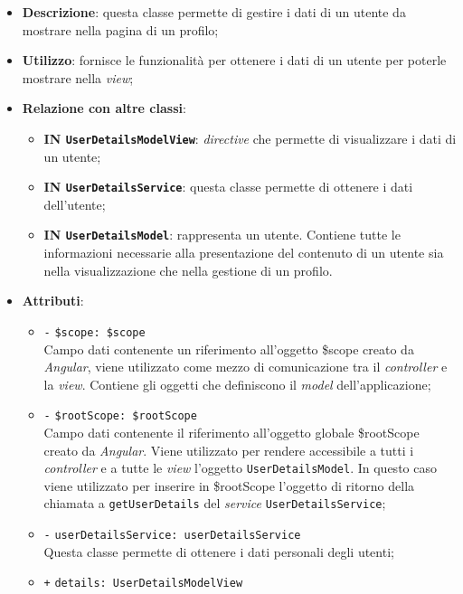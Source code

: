\begin{itemize}
	\item \textbf{Descrizione}: questa classe permette di gestire i dati di un utente da mostrare nella pagina di un profilo;
	\item \textbf{Utilizzo}: fornisce le funzionalità per ottenere i dati di un utente per poterle mostrare nella \textit{view};
	\item \textbf{Relazione con altre classi}:
	\begin{itemize}
		\item \textbf{IN \texttt{UserDetailsModelView}}: \textit{directive} che permette di visualizzare i dati di un utente; 
		\item \textbf{IN \texttt{UserDetailsService}}: questa classe permette di ottenere i dati dell'utente;
		\item \textbf{IN \texttt{UserDetailsModel}}: rappresenta un utente. Contiene tutte le informazioni necessarie alla presentazione del contenuto di un utente sia nella visualizzazione che nella gestione di un profilo.
	\end{itemize}
	\item \textbf{Attributi}:
	\begin{itemize}
		\item \texttt{-} \texttt{\$scope: \$scope} \\
		Campo dati contenente un riferimento all'oggetto \$scope creato da \textit{Angular}, viene utilizzato come mezzo di comunicazione tra il \textit{controller} e la \textit{view}. Contiene gli oggetti che definiscono il \textit{model} dell'applicazione;
		\item \texttt{-} \texttt{\$rootScope: \$rootScope} \\
		Campo dati contenente il riferimento all'oggetto globale \$rootScope creato da \textit{Angular}. Viene utilizzato per rendere accessibile a tutti i \textit{controller} e a tutte le \textit{view} l'oggetto \texttt{UserDetailsModel}. In questo caso viene utilizzato per inserire in \$rootScope l'oggetto di ritorno della chiamata a \texttt{getUserDetails} del \textit{service} \texttt{UserDetailsService};
		\item \texttt{-} \texttt{userDetailsService: userDetailsService} \\ Questa classe permette di ottenere i dati personali degli utenti;
		\item \texttt{+} \texttt{details: UserDetailsModelView} \\

\end{itemize}
\end{itemize}
